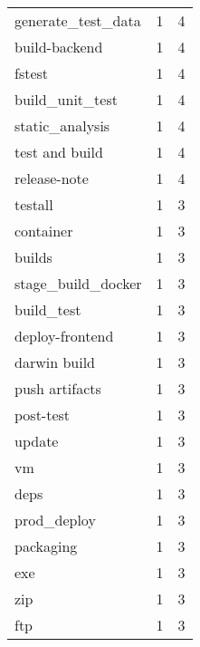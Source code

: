 \begin{tabular}{lrr}
generate\_test\_data         &                   1 &             4 \\
build-backend              &                   1 &             4 \\
fstest                     &                   1 &             4 \\
build\_unit\_test            &                   1 &             4 \\
static\_analysis            &                   1 &             4 \\
test and build             &                   1 &             4 \\
release-note               &                   1 &             4 \\
testall                    &                   1 &             3 \\
container                  &                   1 &             3 \\
builds                     &                   1 &             3 \\
stage\_build\_docker         &                   1 &             3 \\
build\_test                 &                   1 &             3 \\
deploy-frontend            &                   1 &             3 \\
darwin build               &                   1 &             3 \\
push artifacts             &                   1 &             3 \\
post-test                  &                   1 &             3 \\
update                     &                   1 &             3 \\
vm                         &                   1 &             3 \\
deps                       &                   1 &             3 \\
prod\_deploy                &                   1 &             3 \\
packaging                  &                   1 &             3 \\
exe                        &                   1 &             3 \\
zip                        &                   1 &             3 \\
ftp                        &                   1 &             3 \\

\end{tabular}
